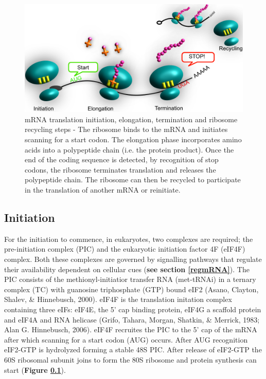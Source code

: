 \documentclass[
  12pt,
  openany]{book}
\begin{document}
\begin{figure}
  \includegraphics{./figures/doodleTranslation.pdf}
  \caption{mRNA translation initiation, elongation, termination and ribosome recycling steps - The ribosome binds to the mRNA and initiates scanning for a start codon. The elongation phase incorporates amino acids into a polypeptide chain (i.e. the protein product). Once the end of the coding sequence is detected, by recognition of stop codons, the ribosome terminates translation and releases the polypeptide chain. The ribosome can then be recycled to participate in the translation of another mRNA or reinitiate. \label{fig:doodlemRNASteps}}
\end{figure}
\clearpage

\subsection{Initiation} \label{initiation}

For the initiation to commence, in eukaryotes, two complexes are required; the pre-initiation complex (PIC) and the eukaryotic initiation factor 4F (eIF4F) complex. Both these complexes are governed by signalling pathways that regulate their availability dependent on cellular cues (\textbf{see section \ref{regmRNA}}). The PIC consists of the methionyl-initiatior transfer RNA (met-tRNAi) in a ternary complex (TC) with guanosine triphosphate (GTP) bound eIF2 (Asano, Clayton, Shalev, \& Hinnebusch, 2000). eIF4F is the translation initation complex containing three eIFs: eIF4E, the 5' cap binding protein, eIF4G a scaffold protein and eIF4A and RNA helicase (Grifo, Tahara, Morgan, Shatkin, \& Merrick, 1983; Alan G. Hinnebusch, 2006). eIF4F recruites the PIC to the 5' cap of the mRNA after which scanning for a start codon (AUG) occurs. After AUG recognition eIF2-GTP is hydrolyzed forming a stable 48S PIC. After release of eIF2-GTP the 60S ribosomal subunit joins to form the 80S ribosome and protein synthesis can start (\textbf{Figure \ref{initiation}}).
\end{document}
